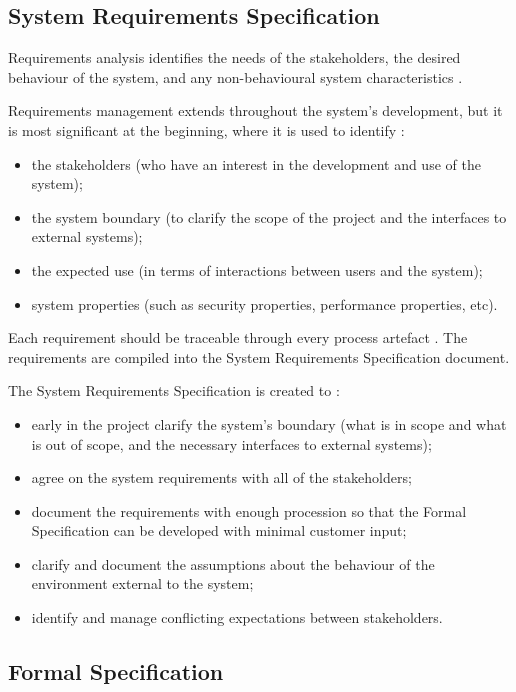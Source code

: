 \subsection{System Requirements Specification}

Requirements analysis identifies the needs of the stakeholders, the desired 
behaviour of the system, and any non-behavioural system characteristics \parencite{Tokeneer}. 

Requirements management extends throughout the system's development, but it is 
most significant at the beginning, where it is used to identify \parencite{Tokeneer}:
\begin{itemize}
	\item the stakeholders (who have an interest in the development and use of the system);
	\item the system boundary (to clarify the scope of the project and the interfaces to external systems);
	\item the expected use (in terms of interactions between users and the system);
	\item system properties (such as security properties, performance properties, etc).
\end{itemize}

Each requirement should be traceable through every process artefact \parencite{Tokeneer}.
The requirements are compiled into the System Requirements Specification document.

The System Requirements Specification is created to \parencite{Tokeneer}:
\begin{itemize}
	\item early in the project clarify the system's boundary (what is in scope 
		and what is out of scope, and the necessary interfaces to external systems);
	\item agree on the system requirements with all of the stakeholders;
	\item document the requirements with enough procession so that the Formal 
		Specification can be developed with minimal customer input;
	\item clarify and document the assumptions about the behaviour of the environment
		external to the system;
	\item identify and manage conflicting expectations between stakeholders.
\end{itemize}

\subsection{Formal Specification}

